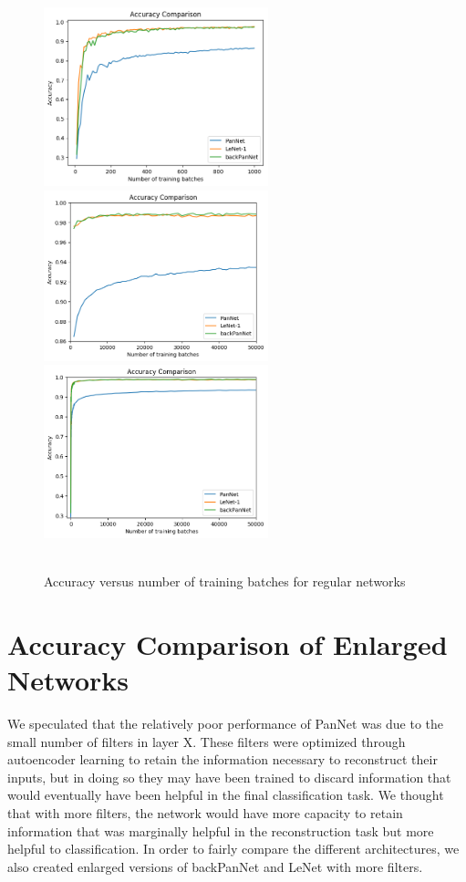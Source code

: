 \begin{figure}[th]
\centering
\includegraphics[width=65mm]{Figures/net_accu_plot_combined_1}
\includegraphics[width=65mm]{Figures/net_accu_plot_combined_2}
\includegraphics[width=65mm]{Figures/net_accu_plot_combined}
\decoRule
\caption{\\Accuracy versus number of training batches for regular networks}
\label{fig:net_accu_plot_combined}
\end{figure}

\section{Accuracy Comparison of Enlarged Networks}

We speculated that the relatively poor performance of PanNet was due to the small number of filters in layer X. These filters were optimized through autoencoder learning to retain the information necessary to reconstruct their inputs, but in doing so they may have been trained to discard information that would eventually have been helpful in the final classification task. We thought that with more filters, the network would have more capacity to retain information that was marginally helpful in the reconstruction task but more helpful to classification. In order to fairly compare the different architectures, we also created enlarged versions of backPanNet and LeNet with more filters.

